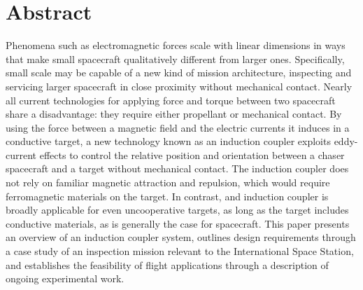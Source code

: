 \section{Abstract}

Phenomena such as electromagnetic forces scale with linear dimensions in ways that make small spacecraft qualitatively different from larger ones.  Specifically, small scale may be capable of a new kind of mission architecture, inspecting and servicing larger spacecraft in close proximity without mechanical contact. Nearly all current technologies for applying force and torque between two spacecraft share a disadvantage: they require either propellant or mechanical contact. By using the force between a magnetic field and the electric currents it induces in a conductive target, a new technology known as an induction coupler exploits eddy-current effects to control the relative position and orientation between a chaser spacecraft and a target without mechanical contact. The induction coupler does not rely on familiar magnetic attraction and repulsion, which would require ferromagnetic materials on the target.  In contrast, and induction coupler is broadly applicable for even uncooperative targets, as long as the target includes conductive materials, as is generally the case for spacecraft.  This paper presents an overview of an induction coupler system, outlines design requirements through a case study of an inspection mission relevant to the International Space Station, and establishes the feasibility of flight applications through a description of ongoing experimental work.